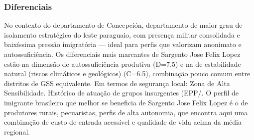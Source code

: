 \subsubsection*{Diferenciais}\label{dif-sargento-jose-felix-lopez-0109}
No contexto do departamento de Concepción, departamento de maior grau de isolamento estratégico do leste paraguaio, com presença militar consolidada e baixíssima pressão imigratória — ideal para perfis que valorizam anonimato e autossuficiência. Os diferenciais mais marcantes de Sargento Jose Felix Lopez estão na dimensão de autossuficiência produtiva (D=7.5) e na de estabilidade natural (riscos climáticos e geológicos) (C=6.5), combinação pouco comum entre distritos de GSS equivalente. Em termos de segurança local: Zona de Alta Sensibilidade. Histórico de atuação de grupos insurgentes (EPP/. O perfil de imigrante brasileiro que melhor se beneficia de Sargento Jose Felix Lopez é o de produtores rurais, pecuaristas, perfis de alta autonomia, que encontra aqui uma combinação de custo de entrada acessível e qualidade de vida acima da média regional.
